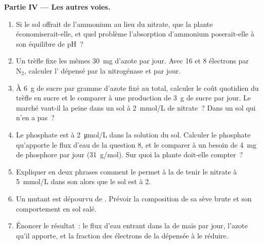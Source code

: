 \begin{problem}
\medskip
\noindent\textbf{Partie IV --- Les autres voies.}
\begin{enumerate}[resume]
  \item Si le sol offrait de l'ammonium au lieu du nitrate, que la
        plante économiserait-elle, et quel problème l'absorption
        d'ammonium poserait-elle à son équilibre de pH~?
  \item Un trèfle fixe les mêmes \qty{30}{mg} d'azote par jour. Avec
        \qty{16}{}  et \qty{8}{} électrons par $\mathrm{N_2}$,
        calculer l' dépensé par la nitrogénase et par jour.
  \item À \qty{6}{g} de sucre par gramme d'azote fixé au total,
        calculer le coût quotidien du trèfle en sucre et le comparer à
        une production de \qty{3}{g} de sucre par jour. Le marché
        vaut-il la peine dans un sol à \qty{2}{mmol/L} de nitrate~?
        Dans un sol qui n'en a pas~?
  \item Le phosphate est à \qty{2}{\micro mol/L} dans la solution du
        sol. Calculer le phosphate qu'apporte le flux d'eau de la
        question 8, et le comparer à un besoin de \qty{4}{mg} de
        phosphore par jour (\qty{31}{g/mol}). Sur quoi la plante
        doit-elle compter~?
  \item Expliquer en deux phrases comment le  permet à
        la  de tenir le nitrate à \qty{5}{mmol/L} dans son 
        alors que le sol est à \qty{2}{}.
  \item Un mutant est dépourvu de . Prévoir la
        composition de sa sève brute et son comportement en sol salé.
  \item Énoncer le résultat~: le flux d'eau entrant dans la  de
        maïs par jour, l'azote qu'il apporte, et la fraction des
        électrons de la  dépensée à le réduire.
\end{enumerate}
\end{problem}
